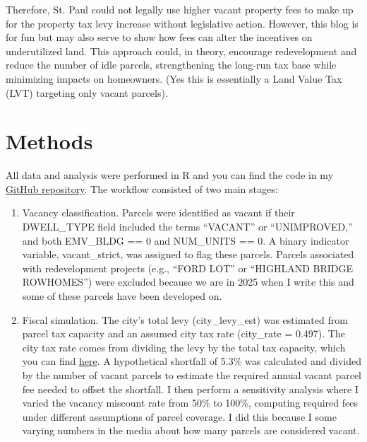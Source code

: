 \documentclass[12pt]{article}
\begin{document}
Therefore, St. Paul could not legally use higher vacant property fees to make up for the property tax levy increase without legislative action. However, this blog is for fun but may also serve to show how fees can alter the incentives on underutilized land. This approach could, in theory, encourage redevelopment and reduce the number of idle parcels, strengthening the long-run tax base while minimizing impacts on homeowners. (Yes this is essentially a Land Value Tax (LVT) targeting only vacant parcels).


\section*{Methods}

All data and analysis were performed in R and you can find the code in my \href{https://github.com/yourusername/your-repo}{GitHub repository}. The workflow consisted of two main stages:

\begin{enumerate}

    \item Vacancy classification. Parcels were identified as vacant if their DWELL\_TYPE field included the terms ``VACANT'' or ``UNIMPROVED,'' and both EMV\_BLDG == 0 and NUM\_UNITS == 0. A binary indicator variable, vacant\_strict, was assigned to flag these parcels. Parcels associated with redevelopment projects (e.g., ``FORD LOT'' or ``HIGHLAND BRIDGE ROWHOMES'') were excluded because we are in 2025 when I write this and some of these parcels have been developed on. 

    \item Fiscal simulation. The city’s total levy (city\_levy\_est) was estimated from parcel tax capacity and an assumed city tax rate (city\_rate = 0.497). The city tax rate comes from dividing the levy by the total tax capacity, which you can find \href{https://www.stpaul.gov/sites/default/files/2024-08/Major%20City%20General%20Fund%20Revenues%202025%20Proposed.pdf}{here}. A hypothetical shortfall of 5.3\% was calculated and divided by the number of vacant parcels to estimate the required annual vacant parcel fee needed to offset the shortfall. I then perform a sensitivity analysis where I varied the vacancy miscount rate from 50\% to 100\%, computing required fees under different assumptions of parcel coverage. I did this because I some varying numbers in the media about how many parcels are considered vacant.
\end{enumerate}
\end{document}
